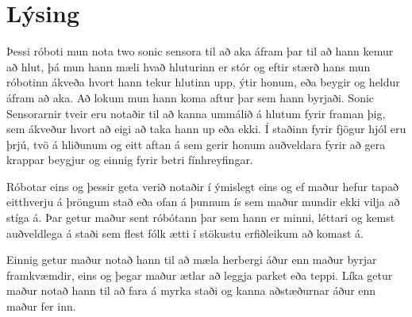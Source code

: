 \section{Lýsing}

\begin{center}
Þessi róboti mun nota two sonic sensora til að aka áfram þar til að hann kemur að hlut, þá mun hann mæli hvað hluturinn er stór og eftir stærð hans mun róbotinn ákveða hvort hann tekur hlutinn upp, ýtir honum, eða beygir og heldur áfram að aka.
Að lokum mun hann koma aftur þar sem hann byrjaði.
Sonic Sensorarnir tveir eru notaðir til að kanna ummálið á hlutum fyrir framan þig, sem ákveður hvort að eigi að taka hann up eða ekki.
Í staðinn fyrir fjögur hjól eru þrjú, tvö á hliðunum og eitt aftan á sem gerir honum auðveldara fyrir að gera krappar beygjur og einnig fyrir betri fínhreyfingar.

Róbotar eins og þessir geta verið notaðir í ýmislegt eins og ef maður hefur tapað eitthverju á þröngum stað eða ofan á þunnum ís sem maður mundir ekki vilja að stíga á.
Þar getur maður sent róbótann þar sem hann er minni, léttari og kemst auðveldlega á staði sem flest fólk ætti í stökustu erfiðleikum að komast á.

Einnig getur maður notað hann til að mæla herbergi áður enn maður byrjar framkvæmdir, eins og þegar maður ætlar að leggja parket eða teppi.
Líka getur maður notað hann til að fara á myrka staði og kanna aðstæðurnar áður enn maður fer inn.
\end{center}